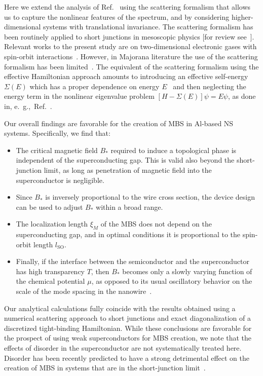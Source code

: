 Here we extend the analysis of Ref.~\cite{Cole2015} using the scattering formalism that allows us to capture the nonlinear features of the spectrum, and by considering higher-dimensional systems with translational invariance.
The scattering formalism has been routinely applied to short junctions in mesoscopic physics [for review see~\cite{Beenakker2005}].
Relevant works to the present study are on two-dimensional electronic gases with spin-orbit interactions~\cite{Bezuglyi2002, Dimitrova2006}.
However, in Majorana literature the use of the scattering formalism has been limited~\cite{Cheng2012}.
The equivalent of the scattering formalism using the effective Hamiltonian approach amounts to introducing an effective self-energy $\Sigma(E)$ which has a proper dependence on energy $E$~\cite{Liu2012, Stanescu2013, Peng2015} and then neglecting the energy term in the nonlinear eigenvalue problem $[H-\Sigma(E)]\psi = E\psi$, as done in, e.~g.,~Ref.~\cite{Poeyhoenen2016}.

Our overall findings are favorable for the creation of MBS in Al-based NS systems.
Specifically, we find that:
\begin{itemize}
\item The critical magnetic field $B_*$ required to induce a topological phase is independent of the superconducting gap.
 This is valid also beyond the short-junction limit, as long as penetration of magnetic field into the superconductor is negligible.
\item Since $B_*$ is inversely proportional to the wire cross section, the device design can be used to adjust $B_*$ within a broad range.
\item The localization length $\xi_M$ of the MBS does not depend on the superconducting gap, and in optimal conditions it is proportional to the spin-orbit length $l_\textrm{SO}$.
\item Finally, if the interface between the semiconductor and the superconductor has high transparency $T$, then $B_*$ becomes only a slowly varying function of the chemical potential $\mu$, as opposed to its usual oscillatory behavior on the scale of the mode spacing in the nanowire~\cite{Wimmer2010, Lutchyn2011}.
\end{itemize}
Our analytical calculations fully coincide with the results obtained using a numerical scattering approach to short junctions and exact diagonalization of a discretized tight-binding Hamiltonian.
While these conclusions are favorable for the prospect of using weak superconductors for MBS creation, we note that the effects of disorder in the superconductor are not systematically treated here.
Disorder has been recently predicted to have a strong detrimental effect on the creation of MBS in systems that are in the short-junction limit~\cite{Cole2016}.

